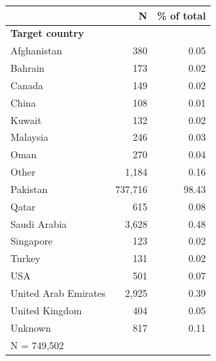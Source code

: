 \begin{tabular}{lrr}


\toprule


 & N & \% of total \\


\midrule


\multicolumn{3}{l}{\textbf{Target country}}\\ 
\midrule
Afghanistan         &         380&        0.05\\
Bahrain             &         173&        0.02\\
Canada              &         149&        0.02\\
China               &         108&        0.01\\
Kuwait              &         132&        0.02\\
Malaysia            &         246&        0.03\\
Oman                &         270&        0.04\\
Other               &       1,184&        0.16\\
Pakistan            &     737,716&       98.43\\
Qatar               &         615&        0.08\\
Saudi Arabia        &       3,628&        0.48\\
Singapore           &         123&        0.02\\
Turkey              &         131&        0.02\\
USA                 &         501&        0.07\\
United Arab Emirates&       2,925&        0.39\\
United Kingdom      &         404&        0.05\\
Unknown             &         817&        0.11\\
\midrule


\multicolumn{3}{l}{\footnotesize N =      749,502}\\


\bottomrule


\end{tabular}


